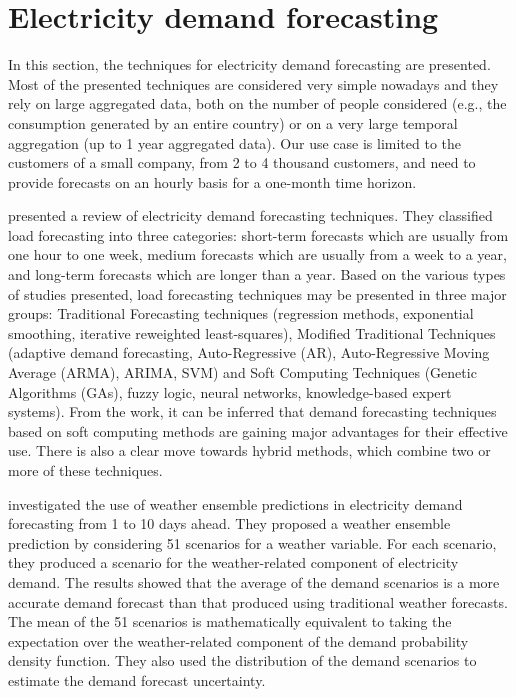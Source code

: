\section{Electricity demand forecasting}
\label{sec:demandsoa}
\vspace{0.2 cm}

In this section, the techniques for electricity demand forecasting are presented.
Most of the presented techniques are considered very simple nowadays and they rely on large aggregated data, both on the number of people considered (e.g., the consumption generated by an entire country) or on a very large temporal aggregation (up to 1 year aggregated data).
Our use case is limited to the customers of a small company, from 2 to 4 thousand customers, and need to provide forecasts on an hourly basis for a one-month time horizon.

\cite{singh2013overview} presented a review of electricity demand forecasting techniques.
They classified load forecasting into three categories:
short-term forecasts which are usually from one hour to one week,
medium forecasts which are usually from a week to a year,
and long-term forecasts which are longer than a year.
Based on the various types of studies presented, load forecasting techniques may be presented in three major groups: Traditional Forecasting techniques (regression methods, exponential smoothing, iterative reweighted least-squares), Modified Traditional Techniques (adaptive demand forecasting, Auto-Regressive (AR), Auto-Regressive Moving Average (ARMA), ARIMA, SVM) and Soft Computing Techniques (Genetic Algorithms (GAs), fuzzy logic, neural networks, knowledge-based expert systems).
From the work, it can be inferred that demand forecasting techniques based on soft computing methods are gaining major advantages for their effective use.
There is also a clear move towards hybrid methods, which combine two or more of these techniques.

\cite{TAYLOR200357} investigated the use of weather ensemble predictions in electricity demand forecasting from 1 to 10 days ahead.
They proposed a weather ensemble prediction by considering 51 scenarios for a weather variable.
For each scenario, they produced a scenario for the weather-related component of electricity demand.
The results showed that the average of the demand scenarios is a more accurate demand forecast than that produced using traditional weather forecasts.
The mean of the 51 scenarios is mathematically equivalent to taking the expectation over the weather-related component of the demand probability density function.
They also used the distribution of the demand scenarios to estimate the demand forecast uncertainty.

